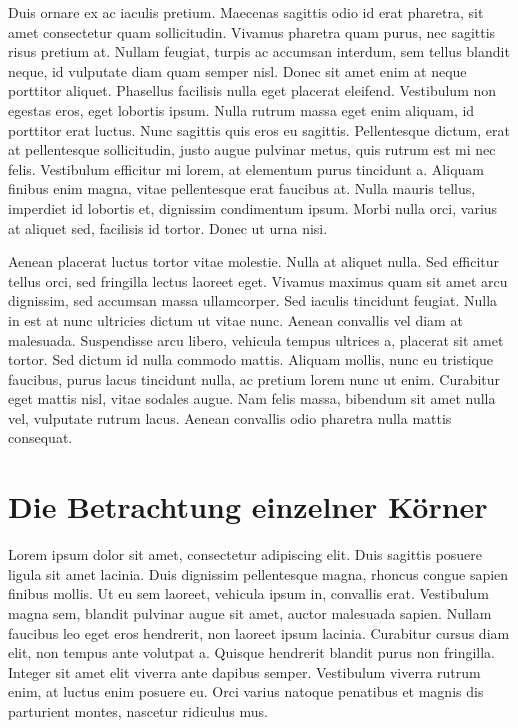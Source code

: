 \documentclass[
  ngerman,
  14pt,
  a4paper,
  DIV=11,
  twoside]{scrreprt}
\begin{document}
Duis ornare ex ac iaculis pretium. Maecenas sagittis odio id erat
pharetra, sit amet consectetur quam sollicitudin. Vivamus pharetra quam
purus, nec sagittis risus pretium at. Nullam feugiat, turpis ac accumsan
interdum, sem tellus blandit neque, id vulputate diam quam semper nisl.
Donec sit amet enim at neque porttitor aliquet. Phasellus facilisis
nulla eget placerat eleifend. Vestibulum non egestas eros, eget lobortis
ipsum. Nulla rutrum massa eget enim aliquam, id porttitor erat luctus.
Nunc sagittis quis eros eu sagittis. Pellentesque dictum, erat at
pellentesque sollicitudin, justo augue pulvinar metus, quis rutrum est
mi nec felis. Vestibulum efficitur mi lorem, at elementum purus
tincidunt a. Aliquam finibus enim magna, vitae pellentesque erat
faucibus at. Nulla mauris tellus, imperdiet id lobortis et, dignissim
condimentum ipsum. Morbi nulla orci, varius at aliquet sed, facilisis id
tortor. Donec ut urna nisi.

Aenean placerat luctus tortor vitae molestie. Nulla at aliquet nulla.
Sed efficitur tellus orci, sed fringilla lectus laoreet eget. Vivamus
maximus quam sit amet arcu dignissim, sed accumsan massa ullamcorper.
Sed iaculis tincidunt feugiat. Nulla in est at nunc ultricies dictum ut
vitae nunc. Aenean convallis vel diam at malesuada. Suspendisse arcu
libero, vehicula tempus ultrices a, placerat sit amet tortor. Sed dictum
id nulla commodo mattis. Aliquam mollis, nunc eu tristique faucibus,
purus lacus tincidunt nulla, ac pretium lorem nunc ut enim. Curabitur
eget mattis nisl, vitae sodales augue. Nam felis massa, bibendum sit
amet nulla vel, vulputate rutrum lacus. Aenean convallis odio pharetra
nulla mattis consequat.

\section{Die Betrachtung einzelner
Körner}\label{die-betrachtung-einzelner-kuxf6rner}

Lorem ipsum dolor sit amet, consectetur adipiscing elit. Duis sagittis
posuere ligula sit amet lacinia. Duis dignissim pellentesque magna,
rhoncus congue sapien finibus mollis. Ut eu sem laoreet, vehicula ipsum
in, convallis erat. Vestibulum magna sem, blandit pulvinar augue sit
amet, auctor malesuada sapien. Nullam faucibus leo eget eros hendrerit,
non laoreet ipsum lacinia. Curabitur cursus diam elit, non tempus ante
volutpat a. Quisque hendrerit blandit purus non fringilla. Integer sit
amet elit viverra ante dapibus semper. Vestibulum viverra rutrum enim,
at luctus enim posuere eu. Orci varius natoque penatibus et magnis dis
parturient montes, nascetur ridiculus mus.
\end{document}
